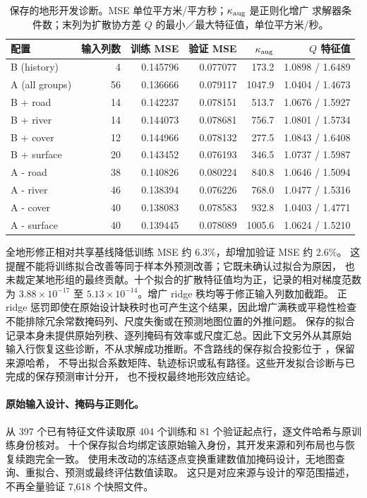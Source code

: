\begin{table}[htbp]
\centering\footnotesize
\caption{保存的地形开发诊断。MSE 单位平方米/平方秒；\(\kappa_{\rm aug}\) 是正则化增广
求解器条件数；末列为扩散协方差 \(Q\) 的最小／最大特征值，单位平方米/秒。}
\label{tab:terrain-fit-diagnostics}\hypertarget{tab:terrain-fit-diagnostics}{}
\begin{tabular}{lrrrrr}
\toprule
配置 & 输入列数 & 训练 MSE & 验证 MSE & \(\kappa_{\rm aug}\) & \(Q\) 特征值\\
\midrule
B (history) & 4 & 0.145796 & 0.077077 & 173.2 & 1.0898 / 1.6489\\
A (all groups) & 56 & 0.136666 & 0.079117 & 1047.9 & 1.0404 / 1.4673\\
B + road & 14 & 0.142237 & 0.078151 & 513.7 & 1.0676 / 1.5927\\
B + river & 14 & 0.144073 & 0.078681 & 756.7 & 1.0801 / 1.5734\\
B + cover & 12 & 0.144966 & 0.078132 & 277.5 & 1.0843 / 1.6408\\
B + surface & 20 & 0.143452 & 0.076193 & 346.5 & 1.0737 / 1.5987\\
A - road & 38 & 0.140826 & 0.080224 & 840.8 & 1.0646 / 1.5094\\
A - river & 46 & 0.138394 & 0.076226 & 768.0 & 1.0477 / 1.5316\\
A - cover & 40 & 0.138083 & 0.078583 & 932.8 & 1.0403 / 1.4771\\
A - surface & 40 & 0.139445 & 0.078089 & 1005.6 & 1.0624 / 1.5210\\
\bottomrule
\end{tabular}
\end{table}

全地形修正相对共享基线降低训练 MSE 约 6.3\%，却增加验证 MSE 约 2.6\%。
这提醒不能将训练拟合改善等同于样本外预测改善；它既未确认过拟合为原因，
也未裁定某地形组的最终贡献。十个拟合的扩散特征值均为正，记录的相对梯度范数为
\(3.88\times10^{-17}\) 至 \(5.13\times10^{-14}\)。增广 ridge 秩均等于修正输入列数加截距。
正 ridge 惩罚即使在原始设计缺秩时也可产生这个结果，因此增广满秩或平稳性检查
不能排除冗余常数掩码列、尺度失衡或在预测地图位置的外推问题。
保存的拟合记录本身未提供原始列秩、逐列掩码有效率或尺度汇总。因此下文另外从其原始
输入行恢复这些诊断，不从求解成功推断。不含路线的保存拟合投影位于
，保留来源哈希，
不导出拟合系数矩阵、轨迹标识或私有路径。这些开发拟合诊断与已完成的保存预测审计分开，
也不授权最终地形效应结论。

\paragraph{原始输入设计、掩码与正则化。}
从 397 个已有特征文件读取原 404 个训练和 81 个验证起点行，逐文件哈希与原训练身份核对。
十个保存拟合均绑定该原始输入身份，其开发来源和列布局也与恢复续跑完全一致。
使用未改动的冻结逐点变换重建数值加掩码设计，无地图查询、重拟合、预测或最终评估数值读取。
这只是对应来源与设计的窄范围描述，不再全量验证 7,618 个快照文件。

